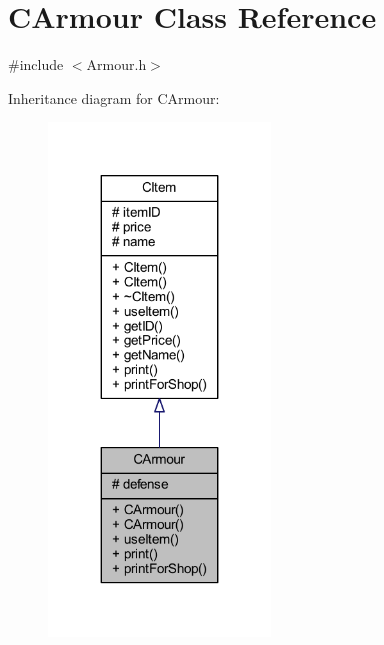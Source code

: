 \hypertarget{class_c_armour}{}\section{C\+Armour Class Reference}
\label{class_c_armour}


{\ttfamily \#include $<$Armour.\+h$>$}



Inheritance diagram for C\+Armour\+:\nopagebreak
\begin{figure}[H]
\begin{center}
\leavevmode
\includegraphics[width=167pt]{class_c_armour__inherit__graph}
\end{center}
\end{figure}


